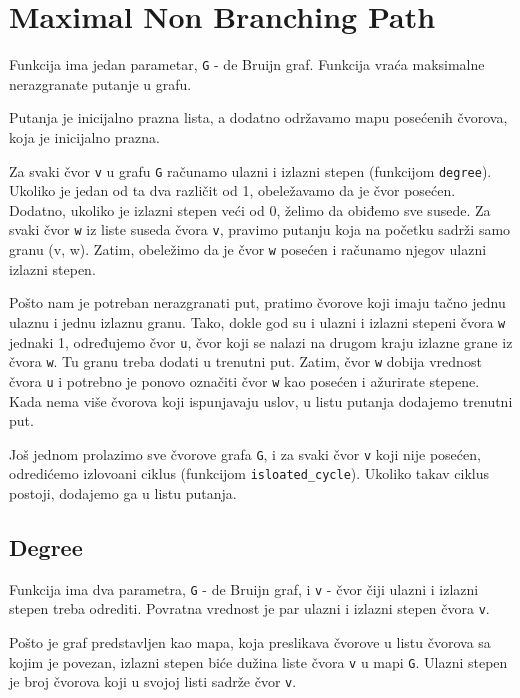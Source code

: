 \section{Maximal Non Branching Path}

Funkcija ima jedan parametar, \texttt{G} - de Bruijn graf. Funkcija vraća maksimalne nerazgranate putanje u grafu.

Putanja je inicijalno prazna lista, a dodatno održavamo mapu posećenih čvorova, koja je inicijalno prazna.

Za svaki čvor \texttt{v} u grafu \texttt{G} računamo ulazni i izlazni stepen (funkcijom \texttt{degree}). Ukoliko je jedan od ta dva različit od 1, obeležavamo da je čvor posećen. Dodatno, ukoliko je izlazni stepen veći od 0, želimo da obiđemo sve susede. Za svaki čvor \texttt{w} iz liste suseda čvora \texttt{v}, pravimo putanju koja na početku sadrži samo granu (v, w). Zatim, obeležimo da je čvor \texttt{w} posećen i računamo njegov ulazni izlazni stepen. 

Pošto nam je potreban nerazgranati put, pratimo čvorove koji imaju tačno jednu ulaznu i jednu izlaznu granu. Tako, dokle god su i ulazni i izlazni stepeni čvora \texttt{w} jednaki 1, određujemo čvor \texttt{u}, čvor koji se nalazi na drugom kraju izlazne grane iz čvora \texttt{w}. Tu granu treba dodati u trenutni put. Zatim, čvor \texttt{w} dobija vrednost čvora \texttt{u} i potrebno je ponovo označiti čvor \texttt{w} kao posećen i ažurirate stepene. Kada nema više čvorova koji ispunjavaju uslov, u listu putanja dodajemo trenutni put.

Još jednom prolazimo sve čvorove grafa \texttt{G}, i za svaki čvor \texttt{v} koji nije posećen, odredićemo izlovoani ciklus (funkcijom \texttt{isloated\_cycle}). Ukoliko takav ciklus postoji, dodajemo ga u listu putanja.






\subsection{Degree}
\label{degree}

Funkcija ima dva parametra, \texttt{G} - de Bruijn graf, i \texttt{v} - čvor čiji ulazni i izlazni stepen treba odrediti. Povratna vrednost je par ulazni i izlazni stepen čvora \texttt{v}.

Pošto je graf predstavljen kao mapa, koja preslikava čvorove u listu čvorova sa kojim je povezan, izlazni stepen biće dužina liste čvora \texttt{v} u mapi \texttt{G}. Ulazni stepen je broj čvorova koji u svojoj listi sadrže čvor \texttt{v}. 

